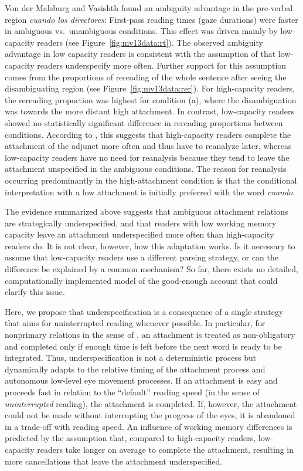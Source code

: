 \documentclass{cambridge7A}\usepackage[]{graphicx}\usepackage[]{color}
\begin{document}
Von der Malsburg and Vasishth found an ambiguity advantage in the pre-verbal region \textit{cuando los directores}: First-pass reading times (gaze durations) were faster in ambiguous vs.\ unambiguous conditions. This effect was driven mainly by low-capacity readers (see Figure~\ref{fig:mv13data:rt}). The observed ambiguity advantage in low capacity readers is consistent with the assumption of \cite{Traxler2007} that low-capacity readers underspecify more often. Further support for this assumption comes from the proportions of rereading of the whole sentence after seeing the disambiguating region (see Figure~\ref{fig:mv13data:rer}). 
For high-capacity readers, the rereading proportion was highest for condition (a), where the disambiguation was towards the more distant high attachment. In contrast, low-capacity readers showed no statistically significant difference in rereading proportions between conditions. According to \cite{MalsburgVasishth2013}, this suggests that high-capacity readers complete the attachment of the adjunct more often and thus have to reanalyze later, whereas low-capacity readers have no need for reanalysis because they tend to leave the attachment unspecified in the ambiguous conditions. The reason for reanalysis occurring predominantly in the high-attachment condition is that the conditional interpretation with a low attachment is initially preferred with the word \textit{cuando}.

The evidence summarized above suggests that ambiguous attachment relations are strategically underspecified, and that readers with
low working memory capacity leave an attachment underspecified more often than high-capacity readers do. 
It is not clear, however, how this adaptation works. Is it necessary to assume that low-capacity readers use a different parsing strategy, or can the difference be explained by a common mechanism? So far, there exists no detailed, computationally implemented model of the good-enough account that could clarify this issue.

Here, we propose that underspecification is a consequence of a single strategy that aims for  uninterrupted reading whenever possible.
In particular, for nonprimary relations in the sense of \cite{FrazierClifton1997}, an attachment is treated as non-obligatory and completed only if enough time is left before the next word is ready to be integrated.
Thus, underspecification is not a deterministic process but dynamically adapts to the relative timing of the attachment process and autonomous low-level eye movement processes. If an attachment is easy and proceeds fast in relation to the ``default'' reading speed (in the sense of \emph{uninterrupted} reading), the attachment is completed. If, however, the attachment could not be made without interrupting the progress of the eyes, it is abandoned in a trade-off with reading speed. 
An influence of working memory differences is predicted by the assumption that, compared to high-capacity readers, low-capacity readers take longer on average to complete the attachment, resulting in more cancellations that leave the attachment underspecified.
\end{document}
